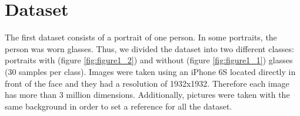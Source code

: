 \section{Dataset}

	The first dataset consists of a portrait of one person. In some portraits, the person was worn glasses. Thus, we divided the dataset into two different classes: portraits with (figure \ref{fig:figure1_2}) and without (figure \ref{fig:figure1_1}) glasses (30 samples per class). Images were taken using an iPhone 6S located directly in front of the face and they had a resolution of 1932x1932. Therefore each image has more than 3 million dimensions. Additionally, pictures were taken with the same background in order to set a reference for all the dataset.
